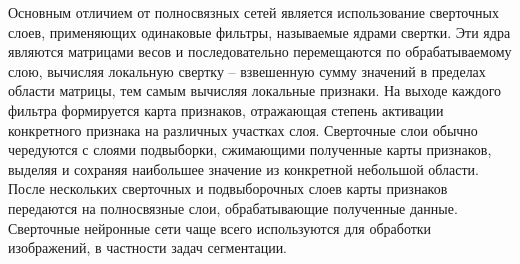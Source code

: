  Основным отличием от полносвязных сетей является использование сверточных слоев, применяющих одинаковые фильтры, называемые ядрами свертки. Эти ядра являются матрицами весов и последовательно перемещаются по обрабатываемому слою, вычисляя локальную свертку -- взвешенную сумму значений в пределах области матрицы, тем самым вычисляя локальные признаки. На выходе каждого фильтра формируется карта признаков, отражающая степень активации конкретного признака на различных участках слоя. Сверточные слои обычно чередуются с слоями подвыборки, сжимающими полученные карты признаков, выделяя и сохраняя наибольшее значение из конкретной небольшой области. После нескольких сверточных и подвыборочных слоев карты признаков передаются на полносвязные слои, обрабатывающие полученные данные. Сверточные нейронные сети чаще всего используются для обработки изображений, в частности задач сегментации. 
